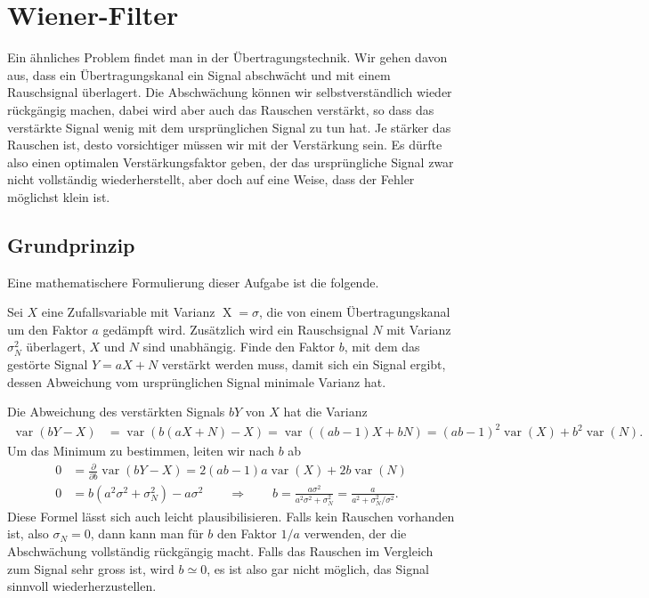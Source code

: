 %
%
%
\section{Wiener-Filter
\label{section:wiener-filter}}
Ein ähnliches Problem findet man in der Übertragungstechnik.
Wir gehen davon aus, dass ein Übertragungskanal ein Signal abschwächt
und mit einem Rauschsignal überlagert.
Die Abschwächung können wir selbstverständlich wieder rückgängig
machen, dabei wird aber auch das Rauschen verstärkt, so dass das
verstärkte Signal wenig mit dem ursprünglichen Signal zu tun hat.
Je stärker das Rauschen ist, desto vorsichtiger müssen wir mit
der Verstärkung sein.
Es dürfte also einen optimalen Verstärkungsfaktor geben, der 
das ursprüngliche Signal zwar nicht vollständig wiederherstellt, 
aber doch auf eine Weise, dass der Fehler möglichst klein ist.

\subsection{Grundprinzip
\label{filter:wiener:subsection:grundprinzip}}
Eine mathematischere Formulierung dieser Aufgabe ist die folgende.

\begin{aufgabe}
Sei $X$ eine Zufallsvariable mit Varianz $\operatorname{X}=\sigma$,
die von einem Übertragungskanal um den Faktor $a$ gedämpft wird.
Zusätzlich wird ein Rauschsignal $N$ mit Varianz $\sigma_N^2$ überlagert,
$X$ und $N$ sind unabhängig.
Finde den Faktor $b$, mit dem das gestörte Signal $Y=aX+N$ verstärkt werden
muss, damit sich ein Signal ergibt, dessen Abweichung vom ursprünglichen Signal
minimale Varianz hat.
\end{aufgabe}

Die Abweichung des verstärkten Signals $bY$ von $X$ hat die Varianz
\begin{align*}
\operatorname{var}(bY-X)
&=
\operatorname{var}(b(aX+N)-X)
=
\operatorname{var}((ab-1)X+bN)
=
(ab-1)^2 \operatorname{var}(X) + b^2\operatorname{var}(N).
\end{align*}
Um das Minimum zu bestimmen, leiten wir nach $b$ ab
\begin{align*}
0
&=
\frac{\partial}{\partial b} \operatorname{var}(bY-X)
=
2(ab-1)a \operatorname{var}(X) +2b\operatorname{var}(N)
\\
0&=
b(a^2\sigma^2 + \sigma_N^2) - a\sigma^2
\qquad\Rightarrow\qquad
b
=
\frac{a\sigma^2}{a^2\sigma^2+\sigma_N^2}
=
\frac{a}{a^2+\sigma_N^2/\sigma^2}.
\end{align*}
Diese Formel lässt sich auch leicht plausibilisieren.
Falls kein Rauschen vorhanden ist, also $\sigma_N=0$, dann kann
man für $b$ den Faktor $1/a$ verwenden, der die Abschwächung
vollständig rückgängig macht.
Falls das Rauschen im Vergleich zum Signal sehr gross ist, wird
$b\simeq 0$, es ist also gar nicht möglich, das Signal sinnvoll
wiederherzustellen.

